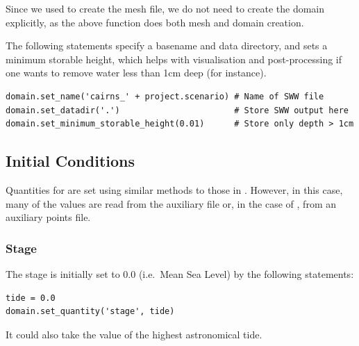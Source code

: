 \documentclass{manual}
\begin{document}
Since we used  to create the mesh file, we do not need to 
create the domain explicitly, as the above function does both mesh and domain creation.

The following statements specify a basename and data directory, and
sets a minimum storable height, which helps with visualisation and post-processing
if one wants to remove water less than 1cm deep (for instance).

\begin{verbatim}
domain.set_name('cairns_' + project.scenario) # Name of SWW file
domain.set_datadir('.')                       # Store SWW output here
domain.set_minimum_storable_height(0.01)      # Store only depth > 1cm
\end{verbatim}

\subsection{Initial Conditions}

Quantities for  are set
using similar methods to those in . However,
in this case, many of the values are read from the auxiliary file
 or, in the case of , from an
auxiliary points file.

\subsubsection{Stage}

The stage is initially set to 0.0 (i.e.\ Mean Sea Level) by the following statements:

\begin{verbatim}
tide = 0.0
domain.set_quantity('stage', tide)
\end{verbatim}

It could also take the value of the highest astronomical tide.


\end{document}
